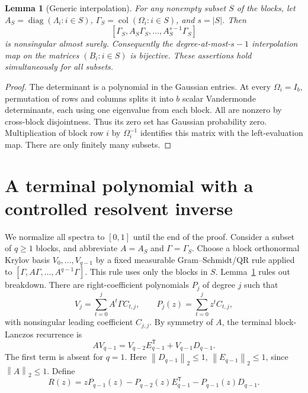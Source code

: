 \documentclass[11pt]{article}
\newtheorem{lemma}[theorem]{Lemma}
\newcommand{\norm}[1]{\left\lVert#1\right\rVert}
\begin{document}
\begin{lemma}[Generic interpolation]\label{lem:generic}
For any nonempty subset $S$ of the blocks, let
$A_S=\operatorname{diag}(\Lambda_i:i\in S)$,
$\Gamma_S=\operatorname{col}(\Omega_i:i\in S)$, and $s=|S|$.
Then
\[
 [\Gamma_S,A_S\Gamma_S,\ldots,A_S^{s-1}\Gamma_S]
\]
is nonsingular almost surely. Consequently the degree-at-most-$s-1$
interpolation map on the matrices $(B_i:i\in S)$ is bijective.
These assertions hold simultaneously for all subsets.
\end{lemma}
\begin{proof}
The determinant is a polynomial in the Gaussian entries. At every
$\Omega_i=I_b$, permutation of rows and columns splits it into $b$
scalar Vandermonde determinants, each using one eigenvalue from each
block. All are nonzero by cross-block disjointness. Thus its zero set
has Gaussian probability zero. Multiplication of block row $i$ by
$\Omega_i^{-1}$ identifies this matrix with the left-evaluation map.
There are only finitely many subsets.
\end{proof}

\section{A terminal polynomial with a controlled resolvent inverse}
We normalize all spectra to $[0,1]$ until the end of the proof.
Consider a subset of $q\geq1$ blocks, and abbreviate $A=A_S$ and
$\Gamma=\Gamma_S$. Choose a block orthonormal Krylov basis
$V_0,\ldots,V_{q-1}$ by a fixed measurable Gram--Schmidt/QR rule applied
to $[\Gamma,A\Gamma,\ldots,A^{q-1}\Gamma]$. This rule uses only the
blocks in $S$. Lemma~\ref{lem:generic} rules out breakdown.
There are right-coefficient polynomials $P_j$ of degree $j$ such that
\[
 V_j=\sum_{t=0}^j A^t\Gamma C_{t,j},\qquad
 P_j(z)=\sum_{t=0}^jz^t C_{t,j},
\]
with nonsingular leading coefficient $C_{j,j}$.
By symmetry of $A$, the terminal block-Lanczos recurrence is
\[
 A V_{q-1}=V_{q-2}E_{q-1}^{\mathsf T}+V_{q-1}D_{q-1}.
\]
The first term is absent for $q=1$. Here $\norm{D_{q-1}}_2\leq1$,
$\norm{E_{q-1}}_2\leq1$, since $\norm A_2\leq1$.
Define
\begin{equation}\label{eq:R}
 R(z)=zP_{q-1}(z)-P_{q-2}(z)E_{q-1}^{\mathsf T}
                         -P_{q-1}(z)D_{q-1}.
\end{equation}
\end{document}
